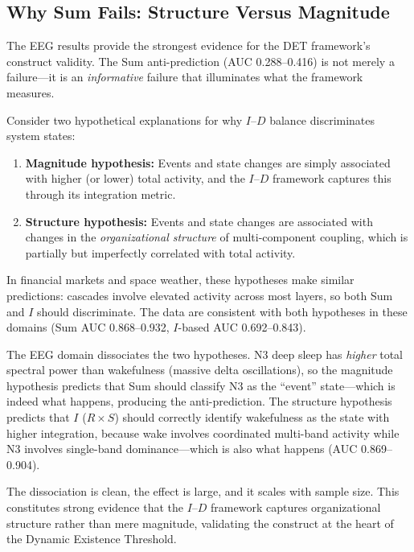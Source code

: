 \documentclass[aip,cha,reprint,amsmath,amssymb]{revtex4-2}
\begin{document}
\subsection{Why Sum Fails: Structure Versus Magnitude}

The EEG results provide the strongest evidence for the DET framework's construct validity. The Sum anti-prediction (AUC 0.288--0.416) is not merely a failure---it is an \emph{informative} failure that illuminates what the framework measures.

Consider two hypothetical explanations for why $I$--$D$ balance discriminates system states:

\begin{enumerate}
\item \textbf{Magnitude hypothesis:} Events and state changes are simply associated with higher (or lower) total activity, and the $I$--$D$ framework captures this through its integration metric.
\item \textbf{Structure hypothesis:} Events and state changes are associated with changes in the \emph{organizational structure} of multi-component coupling, which is partially but imperfectly correlated with total activity.
\end{enumerate}

In financial markets and space weather, these hypotheses make similar predictions: cascades involve elevated activity across most layers, so both Sum and $I$ should discriminate. The data are consistent with both hypotheses in these domains (Sum AUC 0.868--0.932, $I$-based AUC 0.692--0.843).

The EEG domain dissociates the two hypotheses. N3 deep sleep has \emph{higher} total spectral power than wakefulness (massive delta oscillations), so the magnitude hypothesis predicts that Sum should classify N3 as the ``event'' state---which is indeed what happens, producing the anti-prediction. The structure hypothesis predicts that $I$ ($R \times S$) should correctly identify wakefulness as the state with higher integration, because wake involves coordinated multi-band activity while N3 involves single-band dominance---which is also what happens (AUC 0.869--0.904).

The dissociation is clean, the effect is large, and it scales with sample size. This constitutes strong evidence that the $I$--$D$ framework captures organizational structure rather than mere magnitude, validating the construct at the heart of the Dynamic Existence Threshold.
\end{document}
